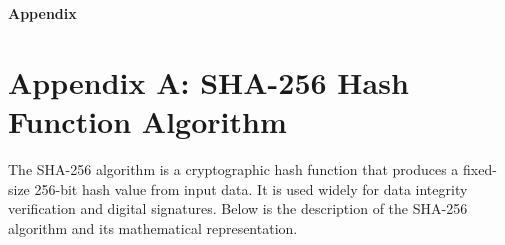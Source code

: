 \clearpage
\thispagestyle{empty} 
\begin{center}
    \vspace*{\fill} 
    \Huge \textbf{Appendix} \\
    \vspace*{\fill}
\end{center}
\clearpage

\appendix
{} 


\renewcommand{\thesection}{\Alph{section}}
\section*{\centering Appendix A: SHA-256 Hash Function Algorithm}

The SHA-256 algorithm is a cryptographic hash function that produces a fixed-size 256-bit hash value from input data. It is used widely for data integrity verification and digital signatures. Below is the description of the SHA-256 algorithm and its mathematical representation.

